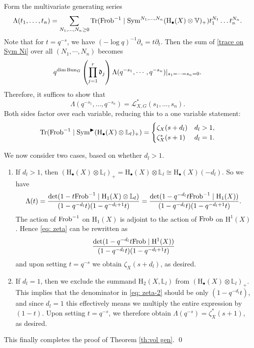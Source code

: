 \documentclass[reqno]{amsart}
\numberwithin{equation}{subsection}
\theoremstyle{definition}
\def\LL{\mathbb{L}}
\def\VV{\mathbb{V}}
\newcommand\frd{\mathfrak{d}}
\newcommand{\sL}{{\mathscr{L}}}
\newcommand{\Bun}{\textup{Bun}}
\newcommand\Frob{\textup{Frob}}
\newcommand\Sym{\textup{Sym}}
\newcommand{\Tr}{\textup{Tr}}
\newcommand{\bu}{\bullet}
\renewcommand{\L}{\Lambda}
\newcommand\bl{\blacktriangleright}
\newcommand\pl{\partial}
\newcommand{\rH}{\ensuremath{\mathrm{H}}\xspace}
\begin{document}
Form the multivariate generating series 
\[
\Lambda(t_1, \ldots, t_n) = \sum_{N_1, \ldots, N_n \geq 0} \Tr(\Frob^{-1} \mid \Sym^{N_1, \ldots, N_n}(\rH_{\bu}(X) \otimes \VV)_+ )t_1^{N_1} \ldots t_n^{N_n}.
\]
Note that for $t = q^{-s}$, we have $(-\log q)^{-1} \pl_s =  t \pl_t$. Then the sum of \eqref{trace on Sym Ni} over all $(N_1,\cdots, N_n)$ becomes
\begin{equation*}
    q^{\dim\Bun_G}\left(\prod_{j=1}^r\frd_j\right)\L(q^{-s_1},\cdots, q^{-s_n})|_{s_1=\cdots=s_n=0}.
\end{equation*}
Therefore, it suffices to show that
\[
\Lambda(q^{-s_1}, \ldots, q^{-s_n})  = \sL_{X,G}^*(s_1, \ldots,s_n).
\]
Both sides factor over each variable, reducing this to a one variable statement: 
\[
 \Tr(\Frob^{-1} \mid \Sym^{\bl} (\rH_{\bu}(X) \otimes \LL_{l})_+)  = \begin{cases} \zeta_X(s+d_l) & d_l > 1, \\ 
\zeta_X^*(s+1) & d_l = 1.
\end{cases}
\]
 


We now consider two cases, based on whether $d_l > 1$. 
\begin{enumerate}
\item If $d_l >1$, then $(\rH_{\bu}(X) \otimes \LL_{l})_+ = \rH_{\bu}(X) \otimes \LL_{l} \cong \rH_{\bu}(X)(-d_l)$. So we have 
\begin{equation}\label{eq: zeta}
\Lambda(t) = \frac{\det(1- t \Frob^{-1}  \mid \rH_1(X) \otimes \LL_{l})}{(1-q^{-d_l}t)(1-q^{-d_l+1}t)}  = \frac{\det(1-q^{-d_l} t \Frob^{-1}   \mid \rH_1(X))}{(1-q^{-d_l}t)(1-q^{-d_l+1}t)}.  
\end{equation}
The action of $\Frob^{-1}$ on $\rH_1(X)$ is adjoint to the action of $\Frob$ on $\rH^1(X)$. Hence \eqref{eq: zeta} can be rewritten as 
\begin{equation}\label{eq: zeta-2}
\frac{\det(1-q^{-d_l} t \Frob   \mid \rH^1(X))}{(1-q^{-d_l}t)(1-q^{-d_l+1}t)}  
\end{equation}
and upon setting $t= q^{-s}$ we obtain $\zeta_X(s+d_l)$, as desired. 


\item If $d_l=1$, then we exclude the summand $\rH_2(X, \LL_{l})$ from $(\rH_{\bu}(X) \otimes \LL_{l})_+$. This implies that the denominator in \eqref{eq: zeta-2} should be only $(1-q^{-d_l} t)$, and since $d_l=1$ this effectively means we multiply the entire expression by $(1-t)$. Upon setting $t=q^{-s}$, we therefore obtain $\Lambda(q^{-s}) = \zeta_X^*(s+1)$, as desired. 
\end{enumerate}
This finally completes the proof of Theorem \ref{th:vol gen}. \qed
\end{document}

